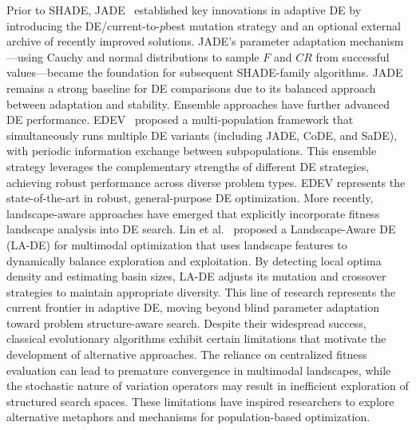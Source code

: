 \documentclass[11pt]{article}
\begin{document}
Prior to SHADE, JADE~\citep{zhang2009jade} established key innovations in adaptive DE by introducing the DE/current-to-$p$best mutation strategy and an optional external archive of recently improved solutions. JADE's parameter adaptation mechanism---using Cauchy and normal distributions to sample $F$ and $CR$ from successful values---became the foundation for subsequent SHADE-family algorithms. JADE remains a strong baseline for DE comparisons due to its balanced approach between adaptation and stability.
Ensemble approaches have further advanced DE performance. EDEV~\citep{wu2018edev} proposed a multi-population framework that simultaneously runs multiple DE variants (including JADE, CoDE, and SaDE), with periodic information exchange between subpopulations. This ensemble strategy leverages the complementary strengths of different DE strategies, achieving robust performance across diverse problem types. EDEV represents the state-of-the-art in robust, general-purpose DE optimization.
More recently, landscape-aware approaches have emerged that explicitly incorporate fitness landscape analysis into DE search. Lin et al.~\citep{lin2024landscape} proposed a Landscape-Aware DE (LA-DE) for multimodal optimization that uses landscape features to dynamically balance exploration and exploitation. By detecting local optima density and estimating basin sizes, LA-DE adjusts its mutation and crossover strategies to maintain appropriate diversity. This line of research represents the current frontier in adaptive DE, moving beyond blind parameter adaptation toward problem structure-aware search.
Despite their widespread success, classical evolutionary algorithms exhibit certain limitations that motivate the development of alternative approaches. The reliance on centralized fitness evaluation can lead to premature convergence in multimodal landscapes, while the stochastic nature of variation operators may result in inefficient exploration of structured search spaces. These limitations have inspired researchers to explore alternative metaphors and mechanisms for population-based optimization.
\end{document}
